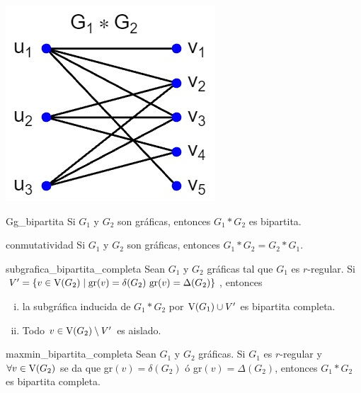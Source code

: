 \documentclass[fleqn, 11pt]{beamer}
\begin{document}
\begin{ejemplo}[breakable, pad at break = 4mm, beforeafter skip = 3mm]{}{}
\begin{enumerate}
            \begin{center}
                \includegraphics[width=0.3\linewidth]{Ejemplo_1/Ejemplo1_Gg.jpg}
            \end{center}
        \end{enumerate}
    \end{ejemplo}

    \begin{proposicion}[beforeafter skip = 4mm]{}{Gg_bipartita}
        Si $ G_1 $ y $ G_2 $ son gráficas, entonces $ G_1 \ast G_2 $ es bipartita.
    \end{proposicion}

    \begin{proposicion}[beforeafter skip = 4mm]{}{conmutatividad}
            Si $ G_1 $ y $ G_2 $ son gráficas, entonces $ G_1 \ast G_2 = G_2 \ast G_1 $.
        \end{proposicion}

    \begin{teorema}[beforeafter skip = 4mm]{}{subgrafica_bipartita_completa}
        Sean $ G_1 $ y $ G_2 $ gráficas tal que $ G_1 $ es $ r $-regular. Si $ V' = \left\lbrace v \in \textnormal{V}(G_2) \mid \textnormal{gr}(v) = \delta(G_2) \textnormal{ gr}(v) = \Delta(G_2) \right\rbrace $, entonces \vspace{3mm}
        
        \begin{enumerate}[i)]
            \item la subgráfica inducida de $ G_1 \ast G_2 $ por $ \textnormal{V}(G_1) \cup V' $ es bipartita completa.
            \item Todo $ v \in \textnormal{V}(G_2) \setminus V' $ es aislado.
        \end{enumerate}
    \end{teorema}

    \begin{corolario}[beforeafter skip = 4mm]{}{maxmin_bipartita_completa}
        Sean $ G_1 $ y $ G_2 $ gráficas. Si $ G_1 $ es $ r $-regular y $ \forall v \in \textnormal{V}(G_2) $ se da que gr$(v) = \delta(G_2) $ ó gr$(v) = \Delta(G_2) $, entonces $ G_1 \ast G_2 $ es bipartita completa.
    \end{corolario}
\end{document}

